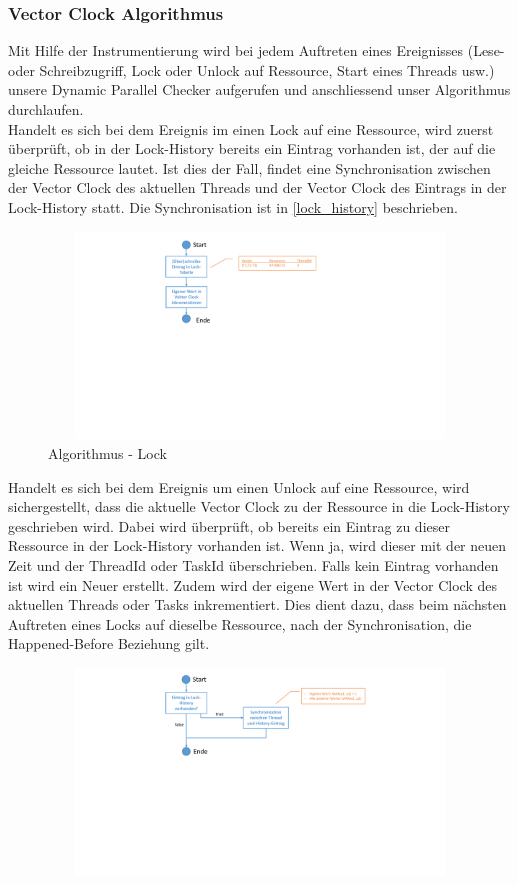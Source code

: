 \documentclass[10pt,a4paper]{article}
\begin{document}
\subsubsection{Vector Clock Algorithmus}\label{vector_algorithm}
\begin{flushleft}
Mit Hilfe der Instrumentierung wird bei jedem Auftreten eines Ereignisses (Lese- oder Schreibzugriff, Lock oder Unlock auf Ressource, Start eines Threads usw.) unsere Dynamic Parallel Checker aufgerufen und anschliessend unser Algorithmus durchlaufen.\\[0.5cm]
Handelt es sich bei dem Ereignis im einen Lock auf eine Ressource, wird zuerst überprüft, ob in der Lock-History bereits ein Eintrag vorhanden ist, der auf die gleiche Ressource lautet. Ist dies der Fall, findet eine Synchronisation zwischen der Vector Clock des aktuellen Threads und der Vector Clock des Eintrags in der Lock-History statt. Die Synchronisation ist in \ref{lock_history} beschrieben.\\
\begin{figure}[H]
	\includegraphics[width=13cm,height=5.5cm,trim=70mm 106mm 80mm 8mm, clip]{images/Lock.pdf}
\caption{Algorithmus - Lock}\label{algo_lock}
\end{figure}
Handelt es sich bei dem Ereignis um einen Unlock auf eine Ressource, wird sichergestellt, dass die aktuelle Vector Clock zu der Ressource in die Lock-History geschrieben wird. Dabei wird überprüft, ob bereits ein Eintrag zu dieser Ressource in der Lock-History vorhanden ist. Wenn ja, wird dieser mit der neuen Zeit und der ThreadId oder TaskId überschrieben. Falls kein Eintrag vorhanden ist wird ein Neuer erstellt. Zudem wird der eigene Wert in der Vector Clock des aktuellen Threads oder Tasks inkrementiert. Dies dient dazu, dass beim nächsten Auftreten eines Locks auf dieselbe Ressource, nach der Synchronisation, die Happened-Before Beziehung gilt. \\
\begin{figure}[H]
	\includegraphics[width=15cm,height=5.5cm,trim=70mm 110mm 50mm 5mm, clip]{images/Unlock.pdf}

\end{figure}
\end{flushleft}
\end{document}

